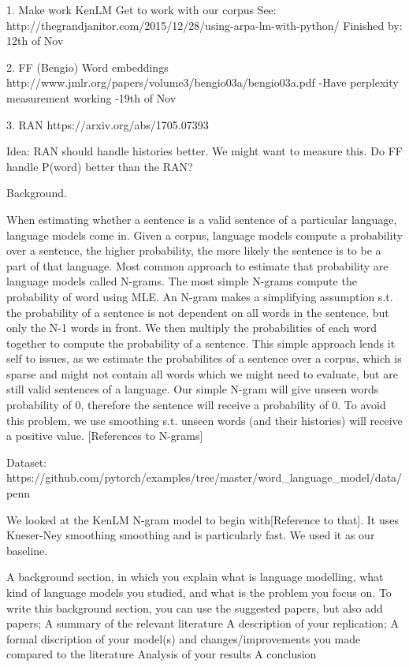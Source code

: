 

1. Make  work KenLM
Get to work with our corpus
See: http://thegrandjanitor.com/2015/12/28/using-arpa-lm-with-python/
Finished by: 12th of Nov

2. FF (Bengio)
Word embeddings
http://www.jmlr.org/papers/volume3/bengio03a/bengio03a.pdf
-Have perplexity measurement working
-19th of Nov

3. RAN
https://arxiv.org/abs/1705.07393


Idea:
RAN should handle histories better. We might want to measure this.
Do FF handle P(word) better than the RAN?

Background.

When estimating whether a sentence is a valid sentence of a particular language, language models come in.
Given a corpus, language models compute a probability over a sentence, the higher probability, the more likely the sentence is to be a part of that language. Most common approach to estimate that probability are language models called N-grams. The most simple N-grams compute the probability of word using MLE. An N-gram makes a simplifying assumption s.t. the probability of a sentence is not dependent on all words in the sentence, but only the N-1 words in front. We then multiply the probabilities of each word together to compute the probability of a sentence. This simple approach lends it self to issues, as we estimate the probabilites of a sentence over a corpus, which is sparse and might not contain all words which we might need to evaluate, but are still valid sentences of a language. Our simple N-gram will give unseen words probability of 0, therefore the sentence will receive a probability of 0. To avoid this problem, we use smoothing s.t. unseen words (and their histories) will receive a positive value. [References to N-grams]

Dataset: https://github.com/pytorch/examples/tree/master/word_language_model/data/penn

We looked at the KenLM N-gram model to begin with[Reference to that]. It uses Kneser-Ney smoothing smoothing and is particularly fast. We used it as our baseline.

A background section, in which you explain what is language modelling, what kind of language models you studied, and what is the problem you focus on. To write this background section, you can use the suggested papers, but also add papers;
A summary of the relevant literature
A description of your replication;
A formal discription of your model(s) and changes/improvements you made compared to the literature
Analysis of your results
A conclusion
